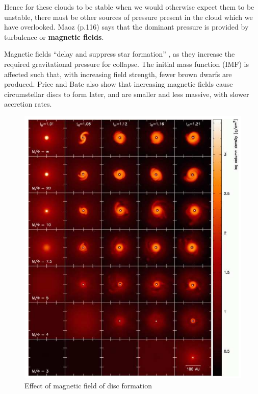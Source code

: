 \documentclass[a4paper]{article} %
\begin{document}
Hence for these clouds to be stable when we would otherwise expect them to be unstable, there must be other sources of pressure present in the cloud which we have overlooked. Maoz (p.116) \cite{Maoz} says that the dominant pressure is provided by turbulence or \textbf{magnetic fields}.

Magnetic fields ``delay and suppress star formation'' \cite{Magnetic}, as they increase the required gravitational pressure for collapse. The initial mass function (IMF) is affected such that, with increasing field strength, fewer brown dwarfs are produced. Price and Bate \cite{PriceAndBate} also show that increasing magnetic fields cause circumstellar discs to form later, and are smaller and less massive, with slower accretion rates.

\pagebreak

\begin{figure}[h]
\centering
\includegraphics[height=0.6\textheight]{images/MF_disc_formation.png}
\caption{Effect of magnetic field of disc formation}
\label{MF}
\end{figure}
\end{document}
